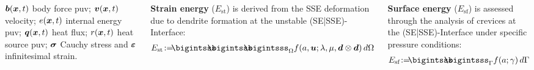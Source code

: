 \documentclass[25pt, a0paper,
portrait,
margin=2mm, 
innermargin=2mm, 
blockverticalspace=7mm, %
colspace=2mm, %
subcolspace=0mm]{tikzposter}
\begin{document}
\begin{columns}
{\begin{minipage}{0.35\textwidth}
\begin{mdframed}
				${\boldsymbol{\mathnormal b}}({\boldsymbol{\mathnormal x}},t)$ body force puv; 
				${\boldsymbol{\mathnormal v}}({\boldsymbol{\mathnormal x}},t)$ velocity; 
				$e({\boldsymbol{\mathnormal x}},t)$ internal energy puv; 
				${\boldsymbol{\mathnormal q}}({\boldsymbol{\mathnormal x}},t)$ heat flux; 
				$r({\boldsymbol{\mathnormal x}},t)$ heat source puv; 
				${\boldsymbol{\sigma}}$ Cauchy stress and 
				${\boldsymbol{\varepsilon}}$ infinitesimal strain.
				\vspace{-6mm}
			\end{mdframed}
			\begin{minipage}{0.5\textwidth}
				\begin{mdframed}
					\textbf{Strain energy} ($E_{\text{st}}$) is derived from the 
					SSE deformation due to
					dendrite formation 
					at the unstable (SE|SSE)-Interface:
					\begin{align*}
						E_{\text{st}} \! := \!\!\!
						\bigintsss\!\!\!\!\!\!\bigintsss\!\!\!\!\!\!\bigintsss_{\Omega}
						f(a,\bm{u};\lambda,\mu,\bm{d}\otimes\bm{d}) \, d\Omega 
					\end{align*}
				\end{mdframed}
			\end{minipage}
			\hfill 
			\begin{minipage}{0.49\textwidth}
				\begin{mdframed}
					\textbf{Surface energy} ($E_{\text{sf}}$)
					is assessed through the analysis
					of crevices at the (SE|SSE)-Interface
					under specific pressure conditions:
					\begin{align*}
						E_{\text{sf}} \! := \!\!\!
						\bigintsss\!\!\!\!\!\!\bigintsss_{\Gamma} f(a;\gamma) \, d\Gamma
					\end{align*}
				\end{mdframed}
			\end{minipage}

\end{minipage}}
\end{columns}
\end{document}
